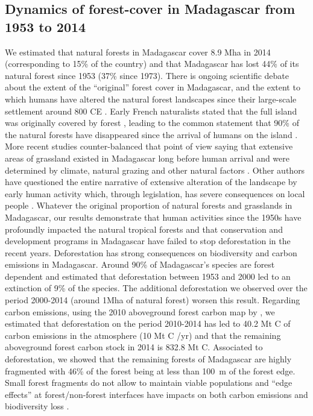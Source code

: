 \documentclass[essd, classical]{copernicus}
\begin{document}
\subsection{Dynamics of forest-cover in Madagascar from 1953 to 2014}

We estimated that natural forests in Madagascar cover 8.9 Mha in 2014
(corresponding to 15\% of the country) and that Madagascar has lost
44\% of its natural forest since 1953 (37\% since 1973). There is
ongoing scientific debate about the extent of the ``original'' forest
cover in Madagascar, and the extent to which humans have altered the
natural forest landscapes since their large-scale settlement around
800 CE \citep{Burns2016, Cox2012}. Early French naturalists stated
that the full island was originally covered by forest
\citep{Humbert1927, Perrier1921}, leading to the common statement that
90\% of the natural forests have disappeared since the arrival of
humans on the island \citep{Kull2000}. More recent studies
counter-balanced that point of view saying that extensive areas of
grassland existed in Madagascar long before human arrival and were
determined by climate, natural grazing and other natural factors
\citep{Vorontsova2017, Virah-Sawmy2009}. Other authors have questioned
the entire narrative of extensive alteration of the landscape by early
human activity which, through legislation, has severe consequences on
local people \citep{Klein2002, Kull2000}. Whatever the original
proportion of natural forests and grasslands in Madagascar, our
results demonstrate that human activities since the 1950s have
profoundly impacted the natural tropical forests and that conservation
and development programs in Madagascar have failed to stop
deforestation in the recent years. Deforestation has strong
consequences on biodiversity and carbon emissions in
Madagascar. Around 90\% of Madagascar's species are forest dependent
\citep{Allnutt2008, Goodman2005} and \citet{Allnutt2008} estimated
that deforestation between 1953 and 2000 led to an extinction of 9\%
of the species. The additional deforestation we observed over the
period 2000-2014 (around 1Mha of natural forest) worsen this
result. Regarding carbon emissions, using the 2010 aboveground forest
carbon map by \citet{Vieilledent2016}, we estimated that deforestation
on the period 2010-2014 has led to 40.2 Mt C of carbon emissions in
the atmosphere (10 Mt C /yr) and that the remaining aboveground forest
carbon stock in 2014 is 832.8 Mt C. Associated to deforestation, we
showed that the remaining forests of Madagascar are highly fragmented
with 46\% of the forest being at less than 100~m of the forest
edge. Small forest fragments do not allow to maintain viable
populations and ``edge effects'' at forest/non-forest interfaces have
impacts on both carbon emissions \citep{Brinck2017} and biodiversity
loss \citep{Gibson2013, Murcia1995}.
\end{document}
